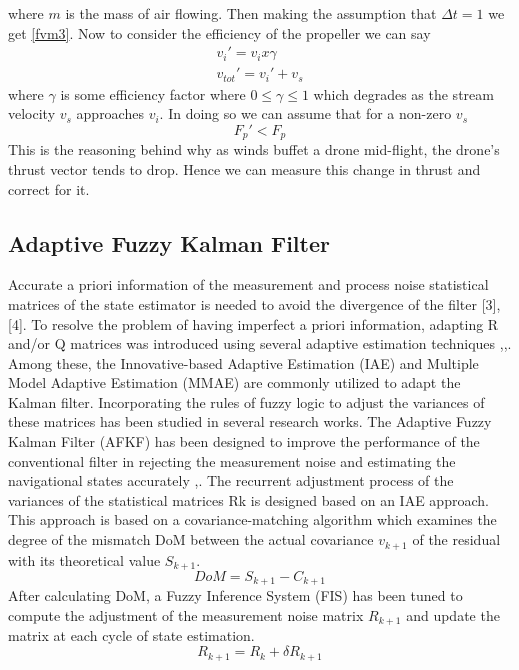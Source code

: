 \documentclass[conference]{IEEEtran}
\begin{document}
where $m$ is the mass of air flowing. Then making the assumption that $\Delta t = 1$ we get \ref{fvm3}.	Now to consider the efficiency of the propeller we can say 
\begin{eqnarray}	
v_{i}\prime = v_{i}x \gamma\\
v_{tot}\prime = v_i\prime + v_s
\label{eff}
\end{eqnarray}
where $\gamma$ is some efficiency factor where $0 \leq  \gamma \leq 1$ which degrades as the stream velocity $v_s$ approaches $v_i$\cite{someone}. In doing so we can assume that for a non-zero $v_s$ 
\begin{equation}
F_p\prime < F_p
\end{equation}
This is the reasoning behind why as winds buffet a drone mid-flight, the drone's thrust vector tends to drop. Hence we can measure this change in thrust and correct for it.
\subsection{Adaptive Fuzzy Kalman Filter }

Accurate a priori information of the measurement and process noise statistical matrices of the state estimator is needed to avoid the divergence of the filter [3], [4]. To resolve the problem of having imperfect a priori information, adapting R and/or Q matrices was introduced using several adaptive estimation techniques \cite{sebesta},\cite{Manki},\cite{Lin}. Among these, the Innovative-based Adaptive Estimation (IAE) and Multiple Model Adaptive Estimation (MMAE) are commonly utilized to adapt the Kalman filter. Incorporating the rules of fuzzy logic to adjust the variances of these matrices has been studied in several research works. The Adaptive Fuzzy Kalman Filter (AFKF) has been designed to improve the performance of the conventional filter in rejecting the measurement noise and estimating the navigational states accurately \cite{Sharman},\cite{Emran}. 
The recurrent adjustment process of the variances of the statistical matrices Rk is designed based on an IAE approach. This approach is based on a covariance-matching algorithm which examines the degree of the mismatch DoM between the actual covariance $v_{k+1}$ of the residual with its theoretical value $S_{k+1}$. 
\begin{equation}
DoM = S_{k+1} - C_{k+1}
\label{dom}
\end{equation}
After calculating DoM, a Fuzzy Inference System (FIS) has been tuned to compute the adjustment of the measurement noise matrix $R_{k+1}$ and update the matrix at each cycle of state estimation.
\begin{equation}
R_{k+1} = R_k +\delta R_{k+1}
\label{rk1}
\end{equation} 
\end{document}
